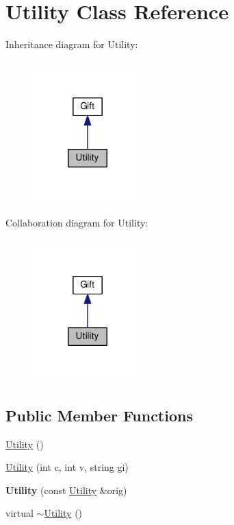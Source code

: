 \hypertarget{class_utility}{\section{Utility Class Reference}
\label{class_utility}
}


Inheritance diagram for Utility\-:
\nopagebreak
\begin{figure}[H]
\begin{center}
\leavevmode
\includegraphics[width=120pt]{class_utility__inherit__graph}
\end{center}
\end{figure}


Collaboration diagram for Utility\-:
\nopagebreak
\begin{figure}[H]
\begin{center}
\leavevmode
\includegraphics[width=120pt]{class_utility__coll__graph}
\end{center}
\end{figure}
\subsection*{Public Member Functions}
\begin{DoxyCompactItemize}
\item 
\hyperlink{class_utility_ac7af3e1642ac8d53ef180180a08fbd00}{Utility} ()
\item 
\hyperlink{class_utility_a3892febb405014a2ff4040e5d5758902}{Utility} (int c, int v, string gi)
\item 
\hypertarget{class_utility_a885e7e19257d533ac194a7cd807d727e}{{\bfseries Utility} (const \hyperlink{class_utility}{Utility} \&orig)}\label{class_utility_a885e7e19257d533ac194a7cd807d727e}

\item 
virtual \hyperlink{class_utility_aecfe4b31e39b00555158a2d8288b874a}{$\sim$\-Utility} ()
\end{DoxyCompactItemize}
